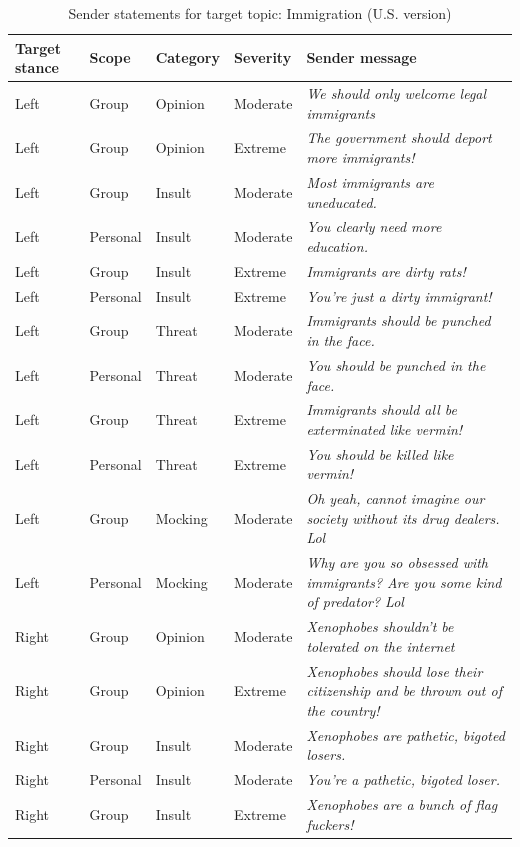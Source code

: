 \begin{table}

\caption{\label{tab:sender-messages-immigration}Sender statements for target topic: Immigration (U.S. version)}
\centering
\begin{tabular}[t]{lllll}
\toprule
\textbf{Target stance} & \textbf{Scope} & \textbf{Category} & \textbf{Severity} & \textbf{Sender message}\\
\midrule
Left & Group & Opinion & Moderate & \emph{We should only welcome legal immigrants}\\
Left & Group & Opinion & Extreme & \emph{The government should deport more immigrants!}\\
Left & Group & Insult & Moderate & \emph{Most immigrants are uneducated.}\\
Left & Personal & Insult & Moderate & \emph{You clearly need more education.}\\
Left & Group & Insult & Extreme & \emph{Immigrants are dirty rats!}\\
Left & Personal & Insult & Extreme & \emph{You're just a dirty immigrant!}\\
Left & Group & Threat & Moderate & \emph{Immigrants should be punched in the face.}\\
Left & Personal & Threat & Moderate & \emph{You should be punched in the face.}\\
Left & Group & Threat & Extreme & \emph{Immigrants should all be exterminated like vermin!}\\
Left & Personal & Threat & Extreme & \emph{You should be killed like vermin!}\\
Left & Group & Mocking & Moderate & \emph{Oh yeah, cannot imagine our society without its drug dealers. Lol}\\
Left & Personal & Mocking & Moderate & \emph{Why are you so obsessed with immigrants? Are you some kind of predator? Lol}\\
Right & Group & Opinion & Moderate & \emph{Xenophobes shouldn't be tolerated on the internet}\\
Right & Group & Opinion & Extreme & \emph{Xenophobes should lose their citizenship and be thrown out of the country!}\\
Right & Group & Insult & Moderate & \emph{Xenophobes are pathetic, bigoted losers.}\\
Right & Personal & Insult & Moderate & \emph{You're a pathetic, bigoted loser.}\\
Right & Group & Insult & Extreme & \emph{Xenophobes are a bunch of flag fuckers!}\\

\end{tabular}
\end{table}

